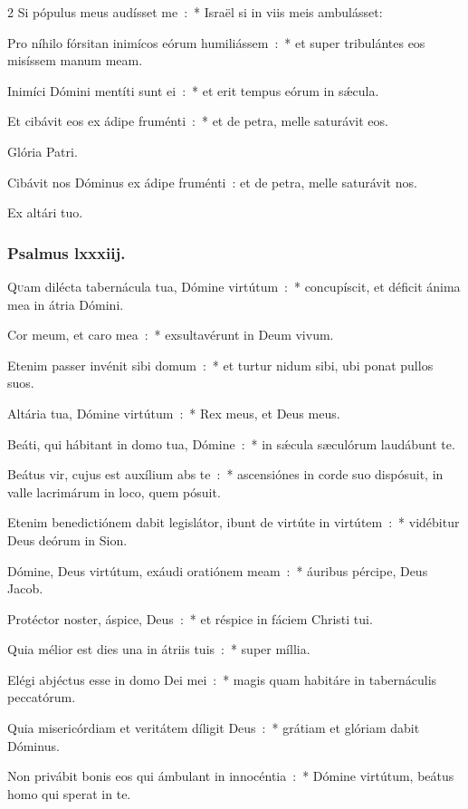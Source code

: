 \documentclass[9pt,twoside]{extarticle}
\begin{document}
\begin{multicols}{2}
Si pópulus meus audísset me~:~* Israël si in viis meis ambulásset:

Pro níhilo fórsitan inimícos eórum humiliássem~:~* et super tribulántes eos misíssem manum meam.

Inimíci Dómini mentíti sunt ei~:~* et erit tempus eórum in sǽcula.

Et cibávit eos ex ádipe fruménti~:~* et de petra, melle saturávit eos.

Glória Patri.

\begin{tightlist}{}
\item {} Cibávit nos Dóminus ex ádipe fruménti~: et de petra, melle saturávit nos.
\item {} Ex altári tuo.
\end{tightlist}

\subsubsection*{\center Psalmus lxxxiij.}
\lettrine{Q}uam dilécta tabernácula tua, Dómine virtútum~:~* concupíscit, et déficit ánima mea in átria Dómini.

Cor meum, et caro mea~:~* exsultavérunt in Deum vivum.

Etenim passer invénit sibi domum~:~* et turtur nidum sibi, ubi ponat pullos suos.

Altária tua, Dómine virtútum~:~* Rex meus, et Deus meus.

Beáti, qui hábitant in domo tua, Dómine~:~* in sǽcula sæculórum laudábunt te.

Beátus vir, cujus est auxílium abs te~:~* ascensiónes in corde suo dispósuit, in valle lacrimárum in loco, quem pósuit.

Etenim benedictiónem dabit legislátor, ibunt de virtúte in virtútem~:~* vidébitur Deus deórum in Sion.

Dómine, Deus virtútum, exáudi oratiónem meam~:~* áuribus pércipe, Deus Jacob.

Protéctor noster, áspice, Deus~:~* et réspice in fáciem Christi tui.

Quia mélior est dies una in átriis tuis~:~* super míllia.

Elégi abjéctus esse in domo Dei mei~:~* magis quam habitáre in tabernáculis peccatórum.

Quia misericórdiam et veritátem díligit Deus~:~* grátiam et glóriam dabit Dóminus.

Non privábit bonis eos qui ámbulant in innocéntia~:~* Dómine virtútum, beátus homo qui sperat in te.


\end{multicols}
\end{document}
